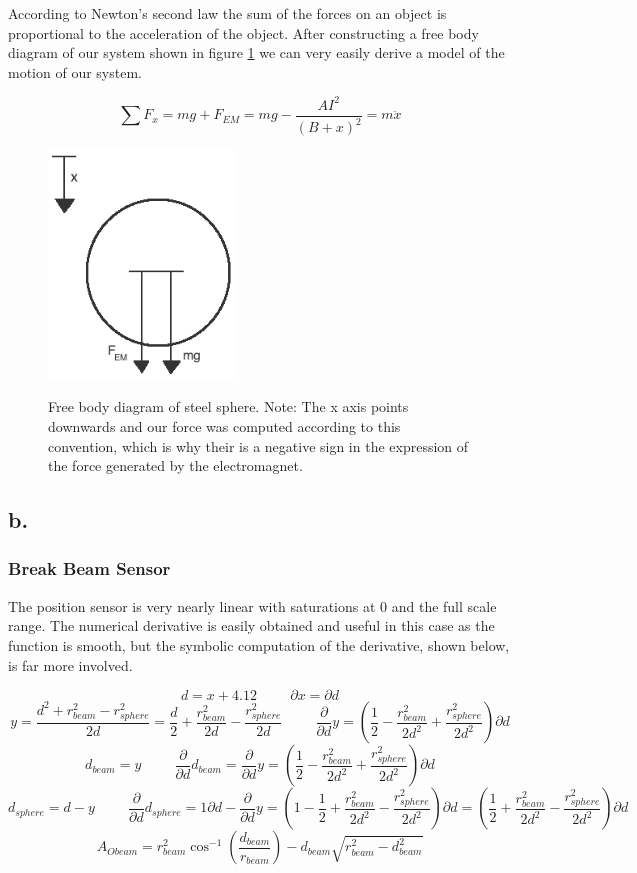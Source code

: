 \documentclass{article}
\theoremstyle{plain}
\theoremstyle{definition}
\theoremstyle{remark}
\begin{document}
According to Newton's second law the sum of the forces on an object is proportional to the acceleration of the object.  After constructing a free body diagram of our system shown in figure \ref{Q1_a4} we can very easily derive a model of the motion of our system.

$$ \sum F_x = mg + F_{EM} = mg -\frac{A I^2}{(B+x)^2} = m  \ddot{x}$$

\begin{figure}
\begin{center}
\includegraphics[width = 5cm]{freebodydiagram.png}
\label{Q1_a4}
\caption{Free body diagram of steel sphere.  Note: The x axis points downwards and our force was computed according to this convention, which is why their is a negative sign in the expression of the force generated by the electromagnet.}
\end{center}
\end{figure}

\subsection*{b.}
\subsubsection*{Break Beam Sensor}
The position sensor is very nearly linear with saturations at 0 and the full scale range.  The numerical derivative is easily obtained and useful in this case as the function is smooth, but the symbolic computation of the derivative, shown below, is far more involved. 

$$ d = x + 4.12 \hspace{1cm} \partial x=\partial d $$
$$ y = \frac{d^2+r_{beam}^2-r_{sphere}^2}{2d}=\frac{d}{2} + \frac{r_{beam}^2}{2d} - \frac{r_{sphere}^2}{2d} \hspace{1cm} \frac{\partial}{\partial d} y = \left(\frac{1}{2}  -\frac{r_{beam}^2}{2d^2} + \frac{r_{sphere}^2}{2d^2}\right) \partial d $$
$$ d_{beam}=y \hspace{1cm} \frac{\partial}{\partial d} d_{beam} =  \frac{\partial}{\partial d} y = \left(\frac{1}{2}  -\frac{r_{beam}^2}{2d^2} + \frac{r_{sphere}^2}{2d^2}\right) \partial d $$
$$  d_{sphere}=d-y \hspace{1cm}   \frac{\partial}{\partial d} d_{sphere} = 1\partial d - \frac{\partial}{\partial d} y = \left(1 - \frac{1}{2}  +\frac{r_{beam}^2}{2d^2} - \frac{r_{sphere}^2}{2d^2}\right) \partial d = \left(\frac{1}{2}  +\frac{r_{beam}^2}{2d^2} - \frac{r_{sphere}^2}{2d^2}\right) \partial d$$
$$ A_{Obeam} = r_{beam}^2 \cos^{-1} (\frac{d_{beam}}{r_{beam}})-d_{beam} \sqrt{r_{beam}^2-d_{beam}^2}$$ 
\end{document}
